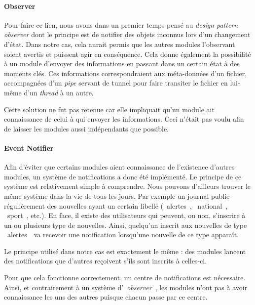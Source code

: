 \documentclass[a4paper,10pt, twoside]{report}
\begin{document}
\begin{spacing}{1.2}
\paragraph{Observer}

\bigskip

Pour faire ce lien, nous avons dans un premier temps pensé au
\textit{design pattern} \textit{observer} dont le principe est de notifier des
objets inconnus lors d'un changement d'état. Dans notre cas, cela aurait permis
que les autres modules l'observant soient avertis et puissent agir en
conséquence. Cela donne également la possibilité à un module d'envoyer des
informations en passant dans un certain état à des moments clés. Ces
informations correspondraient aux méta-données d'un fichier, accompagnées d'un
\textit{pipe} servant de tunnel pour faire transiter le fichier en lui-même
d'un \textit{thread} à un autre.

Cette solution ne fut pas retenue car elle impliquait qu'un module ait
connaissance de celui à qui envoyer les informations. Ceci n'était pas voulu
afin de laisser les modules aussi indépendants que possible.

\paragraph{Event Notifier}

\bigskip

Afin d'éviter que certains modules aient connaissance de l'existence d'autres
modules, un système de notifications a donc été implémenté. Le principe de ce
système est relativement simple à comprendre. Nous pouvons d'ailleurs trouver
le même système dans la vie de tous les jours. Par exemple un journal publie
régulièrement des nouvelles ayant un certain libellé (\flqq~alertes~\frqq,
\flqq~national~\frqq, \flqq~sport~\frqq, etc.). En face, il existe des
utilisateurs qui peuvent, ou non, s'inscrire à un ou plusieurs type de
nouvelles. Ainsi, quelqu'un inscrit aux nouvelles de type \flqq~alertes~\frqq~va
recevoir une notification lorsqu'une nouvelle de ce type apparaît.

Le principe utilisé dans notre cas est exactement le même : des modules lancent
des notifications que d'autres reçoivent s'ils sont inscrits à celles-ci.

Pour que cela fonctionne correctement, un centre de notifications est
nécessaire. Ainsi, et contrairement à un système d'\flqq~\textit{observer}~\frqq,
les modules n'ont pas à avoir connaissance les uns des autres puisque chacun
passe par ce centre.


\end{spacing}
\end{document}
